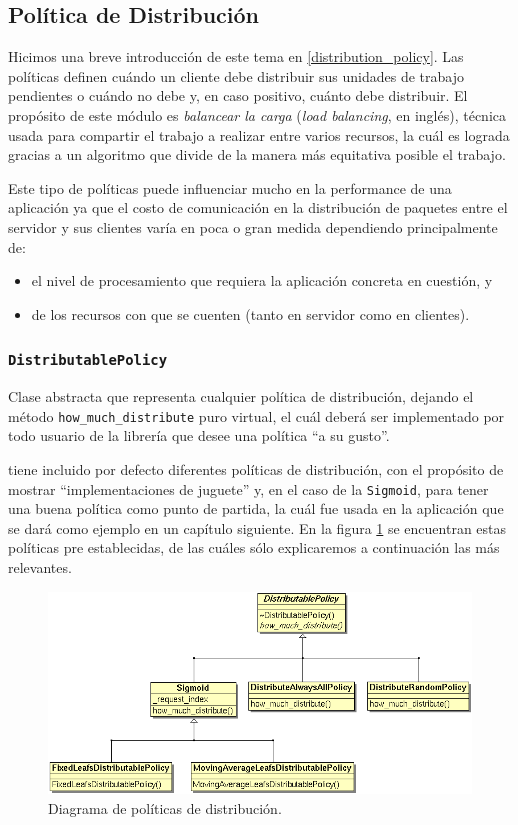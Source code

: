 \subsection{Política de Distribución}

Hicimos una breve introducción de este tema en \ref{distribution_policy}. Las políticas definen cuándo un cliente debe distribuir sus
unidades de trabajo pendientes o cuándo no debe y, en caso positivo, cuánto debe distribuir. El propósito de este módulo es
\textit{balancear la carga} (\textit{load balancing}, en inglés), técnica usada para compartir el trabajo a realizar entre varios recursos,
la cuál es lograda gracias a un algoritmo que divide de la manera más equitativa posible el trabajo.

Este tipo de políticas puede influenciar mucho en la performance de una aplicación ya que el costo de comunicación en la distribución de
paquetes entre el servidor y sus clientes varía en poca o gran medida dependiendo principalmente de:
\begin{itemize}
    \item   el nivel de procesamiento que requiera la aplicación concreta en cuestión, y
    \item   de los recursos con que se cuenten (tanto en servidor como en clientes).
\end{itemize}

\subsubsection{\texttt{DistributablePolicy}}

Clase abstracta que representa cualquier política de distribución, dejando el método \texttt{how\_much\_distribute} puro virtual, el cuál
deberá ser implementado por todo usuario de la librería que desee una política ``a su gusto''.

\rc{} tiene incluido por defecto diferentes políticas de distribución, con el propósito de mostrar ``implementaciones de juguete'' y, en el
caso de la \texttt{Sigmoid}, para tener una buena política como punto de partida, la cuál fue usada en la aplicación que se dará como
ejemplo en un capítulo siguiente. En la figura \ref{distribution_policy_class} se encuentran estas políticas pre
establecidas, de las cuáles sólo
explicaremos a continuación las más relevantes.

\begin{figure}[hb]
    \includegraphics[scale=.6]{images/distribution_policy.png}
    \caption{Diagrama de políticas de distribución.}
    \label{distribution_policy_class}
\end{figure}

